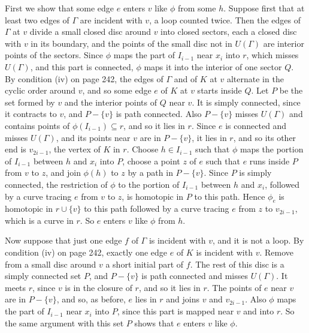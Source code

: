 {First we show that some edge $e$ enters $v$ like $\phi$ from some $h$. Suppose first that at least two edges of $\Gamma$ are incident with $v$, a loop counted twice. Then the edges of $\Gamma$ at $v$ divide a small closed disc around $v$ into closed sectors, each a closed disc with $v$ in its boundary, and the points of the small disc not in $U(\Gamma)$ are interior points of the sectors. Since $\phi$ maps the part of $I_{i-1}$ near $x_i$ into $r$, which misses $U(\Gamma)$, and this part is connected, $\phi$ maps it into the interior of one sector $Q$. By condition (iv) on page 242, the edges of $\Gamma$ and of $K$ at $v$ alternate in the cyclic order around $v$, and so some edge $e$ of $K$ at $v$ starts inside $Q$. Let $P$ be the set formed by $v$ and the interior points of $Q$ near $v$. It is simply connected, since it contracts to $v$, and $P - \{v\}$ is path connected. Also $P - \{v\}$ misses $U(\Gamma)$ and contains points of $\phi(I_{i-1}) \subseteq r$, and so it lies in $r$. Since $e$ is connected and misses $U(\Gamma)$, and its points near $v$ are in $P - \{v\}$, it lies in $r$, and so its other end is $v_{2i-1}$, the vertex of $K$ in $r$. Choose $h \in I_{i-1}$ such that $\phi$ maps the portion of $I_{i-1}$ between $h$ and $x_i$ into $P$, choose a point $z$ of $e$ such that $e$ runs inside $P$ from $v$ to $z$, and join $\phi(h)$ to $z$ by a path in $P - \{v\}$. Since $P$ is simply connected, the restriction of $\phi$ to the portion of $I_{i-1}$ between $h$ and $x_i$, followed by a curve tracing $e$ from $v$ to $z$, is homotopic in $P$ to this path. Hence $\phi_e$ is homotopic in $r \cup \{v\}$ to this path followed by a curve tracing $e$ from $z$ to $v_{2i-1}$, which is a curve in $r$. So $e$ enters $v$ like $\phi$ from $h$.

Now suppose that just one edge $f$ of $\Gamma$ is incident with $v$, and it is not a loop. By condition (iv) on page 242, exactly one edge $e$ of $K$ is incident with $v$. Remove from a small disc around $v$ a short initial part of $f$. The rest of this disc is a simply connected set $P$, and $P - \{v\}$ is path connected and misses $U(\Gamma)$. It meets $r$, since $v$ is in the closure of $r$, and so it lies in $r$. The points of $e$ near $v$ are in $P - \{v\}$, and so, as before, $e$ lies in $r$ and joins $v$ and $v_{2i-1}$. Also $\phi$ maps the part of $I_{i-1}$ near $x_i$ into $P$, since this part is mapped near $v$ and into $r$. So the same argument with this set $P$ shows that $e$ enters $v$ like $\phi$.

}
